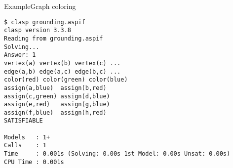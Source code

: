 \begin{frame}[fragile]{Example}{Graph coloring}
\begin{adjustbox}{max totalsize={\textwidth}{.83\textheight},keepaspectratio}
\begin{lstlisting}
$ clasp grounding.aspif
clasp version 3.3.8
Reading from grounding.aspif
Solving...
Answer: 1
vertex(a) vertex(b) vertex(c) ...
edge(a,b) edge(a,c) edge(b,c) ...
color(red) color(green) color(blue)
assign(a,blue)  assign(b,red)
assign(c,green) assign(d,blue)
assign(e,red)   assign(g,blue)
assign(f,blue)  assign(h,red)
SATISFIABLE

Models   : 1+
Calls    : 1
Time     : 0.001s (Solving: 0.00s 1st Model: 0.00s Unsat: 0.00s)
CPU Time : 0.001s
\end{lstlisting}%
\end{adjustbox}
\end{frame}
%
